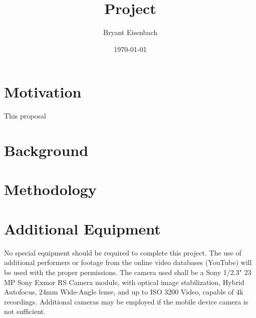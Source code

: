 \documentclass[titlepage]{article}
\author{Bryant Eisenbach}
\title{\project Project}
\date{\today}
\begin{document}
\section{Motivation}
This proposal 


\section{Background}


\section{Methodology}


\pagebreak
\section{Additional Equipment}
No special equipment should be required to complete this project.
The use of additional performers or footage from the online video databases
(YouTube) will be used with the proper permissions.
The camera used shall be a Sony 1/2.3" 23 MP Sony Exmor RS Camera module,
with optical image stabilization, Hybrid Autofocus, 24mm Wide-Angle lense,
and up to ISO 3200 Video, capable of 4k recordings.
Additional cameras may be employed if the mobile device camera is not sufficient.

\pagebreak
\small
{}

\end{document}
